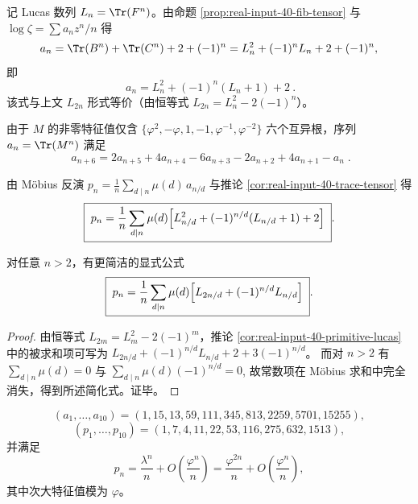 \begin{corollary}\label{cor:real-input-40-trace-tensor}
记 Lucas 数列 $L_n=\Tr(F^n)$。由命题 \ref{prop:real-input-40-fib-tensor} 与 $\log\zeta=\sum a_n z^n/n$ 得
\[
a_n=\Tr(B^n)+\Tr(C^n)+2+(-1)^n
=L_n^2+(-1)^nL_n+2+(-1)^n,
\]
即
\[
\boxed{\ a_n=L_n^2+(-1)^n(L_n+1)+2\ }.
\]
该式与上文 $L_{2n}$ 形式等价（由恒等式 $L_{2n}=L_n^2-2(-1)^n$）。
\end{corollary}

\begin{corollary}\label{cor:real-input-40-trace-recurrence}
由于 $M$ 的非零特征值仅含
\(
\{\varphi^2,-\varphi,1,-1,\varphi^{-1},\varphi^{-2}\}
\)
六个互异根，序列 $a_n=\Tr(M^n)$ 满足
\[
\boxed{\;
a_{n+6}=2a_{n+5}+4a_{n+4}-6a_{n+3}-2a_{n+2}+4a_{n+1}-a_n\;}.
\]
\end{corollary}

\begin{corollary}\label{cor:real-input-40-primitive-lucas}
由 Möbius 反演
\(
p_n=\frac{1}{n}\sum_{d\mid n}\mu(d)\,a_{n/d}
\)
与推论 \ref{cor:real-input-40-trace-tensor} 得
\[
\boxed{\;
p_n=\frac{1}{n}\sum_{d\mid n}\mu(d)\Bigl[L_{n/d}^2+(-1)^{n/d}(L_{n/d}+1)+2\Bigr]\; }.
\]
\end{corollary}

\begin{corollary}\label{cor:real-input-40-primitive-lucas-simplified}
对任意 $n>2$，有更简洁的显式公式
\[
\boxed{\;
p_n=\frac{1}{n}\sum_{d\mid n}\mu(d)\Bigl[L_{2n/d}+(-1)^{n/d}L_{n/d}\Bigr]\; }.
\]
\end{corollary}
\begin{proof}
由恒等式 $L_{2m}=L_m^2-2(-1)^m$，推论 \ref{cor:real-input-40-primitive-lucas} 中的被求和项可写为
\(
L_{2n/d}+(-1)^{n/d}L_{n/d}+2+3(-1)^{n/d}
\)。
而对 $n>2$ 有
\(
\sum_{d\mid n}\mu(d)=0
\)
与
\(
\sum_{d\mid n}\mu(d)(-1)^{n/d}=0
\),
故常数项在 Möbius 求和中完全消失，得到所述简化式。证毕。
\end{proof}
\[
(a_1,\dots,a_{10})=(1,15,13,59,111,345,813,2259,5701,15255),
\]
\[
(p_1,\dots,p_{10})=(1,7,4,11,22,53,116,275,632,1513),
\]
并满足
\[
p_n=\frac{\lambda^n}{n}+O\!\left(\frac{\varphi^n}{n}\right)
=\frac{\varphi^{2n}}{n}+O\!\left(\frac{\varphi^n}{n}\right),
\]
其中次大特征值模为 $\varphi$。
